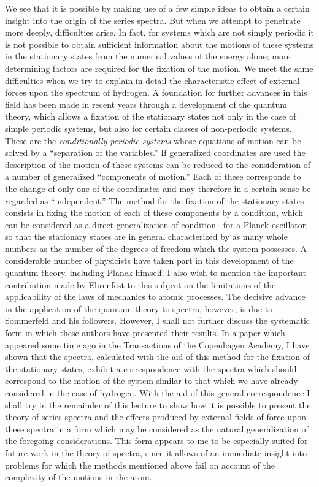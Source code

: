 
We see that it is possible by making use of a few simple ideas
to obtain a certain insight into the origin of the series spectra.
But when we attempt to penetrate more deeply, difficulties arise.
In fact, for systems which are not simply periodic it is not possible
to obtain sufficient information about the motions of these systems
in the stationary states from the numerical values of the energy
alone; more determining factors are required for the fixation of
the motion. We meet the same difficulties when we try to explain
in detail the characteristic effect of external forces upon the spectrum
of hydrogen. A foundation for further advances in this field has
been made in recent years through a development of the quantum
theory, which allows a fixation of the stationary states not only in
the case of simple periodic systems, but also for certain classes of
non-periodic systems. These are the \emph{conditionally periodic systems}
whose equations of motion can be solved by a ``separation of the
variables.'' If generalized coordinates are used the description of
the motion of these systems can be reduced to the consideration
of a number of generalized ``components of motion.'' Each of these
corresponds to the change of only one of the coordinates and may
therefore in a certain sense be regarded as ``independent.'' The
method for the fixation of the stationary states consists in fixing
the motion of each of these components by a condition, which can
be considered as a direct generalization of condition~ for a
Planck oscillator, so that the stationary states are in general
characterized by as many whole numbers as the number of the
degrees of freedom which the system possesses. A considerable
number of physicists have taken part in this development of the
quantum theory, including Planck himself. I also wish to mention
the important contribution made by Ehrenfest to this subject on
the limitations of the applicability of the laws of mechanics to
atomic processes. The decisive advance in the application of the
quantum theory to spectra, however, is due to Sommerfeld and his
followers. However, I shall not further discuss the systematic form
in which these authors have presented their results. In a paper which
appeared some time ago in the Transactions of the Copenhagen
Academy, I have shown that the spectra, calculated with the aid
of this method for the fixation of the stationary states, exhibit a
correspondence with the spectra which should correspond to the
motion of the system similar to that which we have already considered
in the case of hydrogen. With the aid of this general
correspondence I shall try in the remainder of this lecture to
show how it is possible to present the theory of series spectra
and the effects produced by external fields of force upon these
spectra in a form which may be considered as the natural generalization
of the foregoing considerations. This form appears to me
to be especially suited for future work in the theory of spectra,
since it allows of an immediate insight into problems for which
the methods mentioned above fail on account of the complexity of
the motions in the atom.

